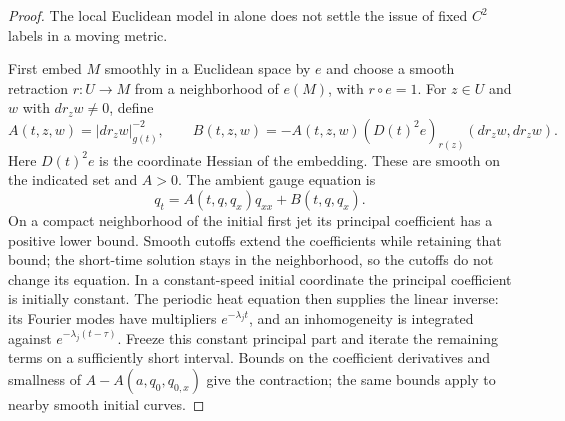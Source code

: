 \begin{proof}
The local Euclidean model in
\cite[Claim 19.1, p.~437]{MT2007} alone does not settle the issue of
fixed $C^2$ labels in a moving metric.

First embed $M$ smoothly in a Euclidean space by $e$ and choose a smooth
retraction $r:U\to M$ from a neighborhood of $e(M)$, with $r\circ e=1$.
For $z\in U$ and $w$ with $dr_z w\ne0$, define
\[
 A(t,z,w)=|dr_z w|_{g(t)}^{-2},\qquad
 B(t,z,w)=-A(t,z,w)(D(t)^2e)_{r(z)}(dr_z w,dr_z w).
\]
Here $D(t)^2e$ is the coordinate Hessian of the embedding.  These are smooth
on the indicated set and $A>0$.  The ambient gauge equation is
\begin{equation}\label{eq:ramps-gauge}
 q_t=A(t,q,q_x)q_{xx}+B(t,q,q_x).
\end{equation}
On a compact neighborhood of the initial first jet its principal coefficient
has a positive lower bound.  Smooth cutoffs extend the coefficients while
retaining that bound; the short-time solution stays in the neighborhood,
so the cutoffs do not change its equation.  In a constant-speed initial
coordinate the principal coefficient is initially constant.  The periodic
heat equation then supplies the linear inverse: its Fourier modes have
multipliers $e^{-\lambda_j t}$, and an inhomogeneity is integrated against
$e^{-\lambda_j(t-\tau)}$.  Freeze this constant principal part and iterate
the remaining terms on a sufficiently short interval.  Bounds on the
coefficient derivatives and smallness of $A-A(a,q_0,q_{0,x})$ give the
contraction; the same bounds apply to nearby smooth initial curves.


\end{proof}
